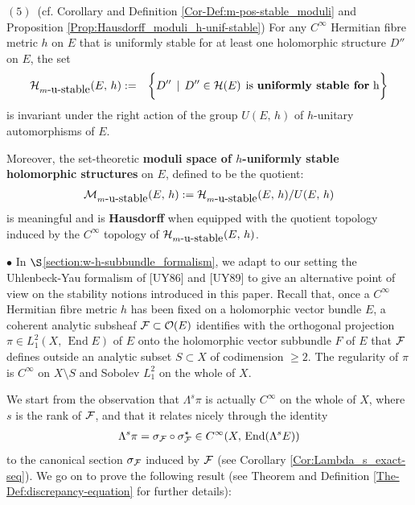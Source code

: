\documentclass[12pt]{article}
\begin{document}
\begin{The}
\vspace{1ex}

$(5)$\, (cf. Corollary and Definition \ref{Cor-Def:m-pos-stable_moduli} and Proposition \ref{Prop:Hausdorff_moduli_h-unif-stable}) For any $C^\infty$ Hermitian fibre metric $h$ on $E$ that is uniformly stable for at least one holomorphic structure $D''$ on $E$, the set \begin{eqnarray*}{\cal H}_{m\mbox{-u-stable}}(E,\,h) &:=& \bigg\{D''\,\mid\, D''\in{\cal H}(E) \hspace{1ex} \mbox{is {\bf uniformly stable for} h}\bigg\}\end{eqnarray*} is invariant under the right action of the group $U(E,\,h)$ of $h$-unitary automorphisms of $E$.

  Moreover, the set-theoretic {\bf moduli space of $h$-uniformly stable holomorphic structures} on $E$, defined to be the quotient: \begin{eqnarray*}{\cal M}_{m\mbox{-u-stable}}(E,\,h):={\cal H}_{m\mbox{-u-stable}}(E,\,h)/U(E,\,h)\end{eqnarray*} is meaningful and is {\bf Hausdorff} when equipped with the quotient topology induced by the $C^\infty$ topology of ${\cal H}_{m\mbox{-u-stable}}(E,\,h)$. 

\end{The}  

\vspace{2ex}

$\bullet$ In $\S$\ref{section:w-h-subbundle_formalism}, we adapt to our setting the Uhlenbeck-Yau formalism of [UY86] and [UY89] to give an alternative point of view on the stability notions introduced in this paper. Recall that, once a $C^\infty$ Hermitian fibre metric $h$ has been fixed on a holomorphic vector bundle $E$, a coherent analytic subsheaf ${\cal F}\subset{\cal O}(E)$ identifies with the orthogonal projection $\pi\in L^2_1(X,\,\operatorname{End}E)$ of $E$ onto the holomorphic vector subbundle $F$ of $E$ that ${\cal F}$ defines outside an analytic subset $S\subset X$ of codimension $\geq 2$. The regularity of $\pi$ is $C^\infty$ on $X\setminus S$ and Sobolev $L^2_1$ on the whole of $X$.

We start from the observation that $\Lambda^s\pi$ is actually $C^\infty$ on the whole of $X$, where $s$ is the rank of ${\cal F}$, and that it relates nicely through the identity \begin{eqnarray*}\Lambda^s\pi = \sigma_{\cal F}\circ\sigma_{\cal F}^\star\in C^\infty(X,\,\operatorname{End}(\Lambda^sE))\end{eqnarray*} to the canonical section $\sigma_{\cal F}$ induced by ${\cal F}$ (see Corollary \ref{Cor:Lambda_s_exact-seq}). We go on to prove the following result (see Theorem and Definition \ref{The-Def:discrepancy-equation} for further details):
\end{document}
